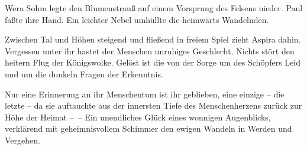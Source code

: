 Wera Sohm legte den Blumenstrauß auf einem Vorsprung des Felsens
nieder. Paul faßte ihre Hand. Ein leichter Nebel umhüllte die
heimwärts Wandelnden.

Zwischen Tal und Höhen steigend und fließend in freiem Spiel zieht
Aspira dahin. Vergessen unter ihr hastet der Menschen unruhiges
Geschlecht. Nichts stört den heitern Flug der Königswolke. Gelöst
ist die von der Sorge um des Schöpfers Leid und um die dunkeln
Fragen der Erkenntnis.

Nur eine Erinnerung an ihr Menschentum ist ihr geblieben, eine
einzige – die letzte – da sie auftauchte aus der innersten Tiefe
des Menschenherzens zurück zur Höhe der Heimat –~– Ein unendliches
Glück eines wonnigen Augenblicks, verklärend mit geheimnisvollem
Schimmer den ewigen Wandeln in Werden und Vergehen.


